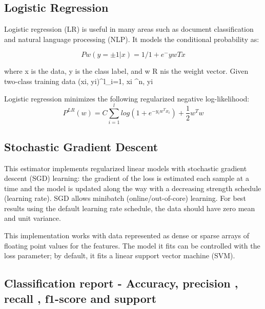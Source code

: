\documentclass[a4paper, 12pt]{article}
\begin{document}
\subsection{Logistic Regression}

Logistic regression (LR) is useful in many areas such as document classification and
natural language processing (NLP). It models the conditional probability as:

\large
\begin{equation}
    Pw(y = ±1|x) = 1/1 + e^−{ywTx}
    \label{eq:cond1}
\end{equation}
\normalsize

where x is the data, y is the class label, and w  R nis the weight vector. Given two-class training data {(xi, yi)}^{l}_{i=1}, xi \in {}^{n}, yi 

\newline
Logistic regression minimizes the following regularized negative log-likelihood:
\large
\begin{equation}
P^{LR}(w) = C\sum^{l}_{i=1}log(1+e^{-y_{i}w^{T}x_{i}}) + \frac{1}{2}w^{T}w
    \label{eq:cond2}
\end{equation}
\normalsize

\cite{journals/ml/YuHL11}

\subsection{Stochastic Gradient Descent}

This estimator implements regularized linear models with stochastic gradient descent (SGD) learning: the gradient of the loss is estimated each sample at a time and the model is updated along the way with a decreasing strength schedule (learning rate). SGD allows minibatch (online/out-of-core) learning.
For best results using the default learning rate schedule, the data should have zero mean and unit variance. \cite{conf/kdd/ZadroznyE02}

This implementation works with data represented as dense or sparse arrays of floating point values for the features. The model it fits can be controlled with the loss parameter; by default, it fits a linear support vector machine (SVM).
\cite{journals/jmlr/ZhangDJ02}

\subsection{Classification report - Accuracy, precision , recall , f1-score and support}
\end{document}
